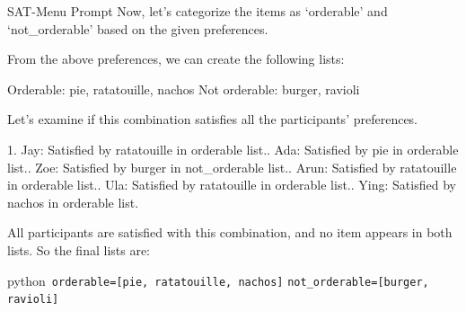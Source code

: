 \documentclass{article} %
\begin{document}
\begin{mybox}[label=table: sat-menu example]{SAT-Menu Prompt}
Now, let's categorize the items as `orderable' and `not\_orderable' based on the given preferences.\newline

From the above preferences, we can create the following lists:\newline

Orderable: pie, ratatouille, nachos\newline
Not orderable: burger, ravioli\newline

Let's examine if this combination satisfies all the participants' preferences.\newline

1. Jay: Satisfied by ratatouille in orderable list.. Ada: Satisfied by pie in orderable list.. Zoe: Satisfied by burger in not\_orderable list.. Arun: Satisfied by ratatouille in orderable list.. Ula: Satisfied by ratatouille in orderable list.. Ying: Satisfied by nachos in orderable list.\newline

All participants are satisfied with this combination, and no item appears in both lists. \newline
So the final lists are:\newline

\texttt{\textasciigrave{}\textasciigrave{}\textasciigrave{}}python\newline\
\texttt{orderable=[pie, ratatouille, nachos]} \newline
\texttt{not\_orderable=[burger, ravioli]}%
\newline\
\texttt{\textasciigrave{}\textasciigrave{}\textasciigrave{}}
\end{mybox}

\end{document}
